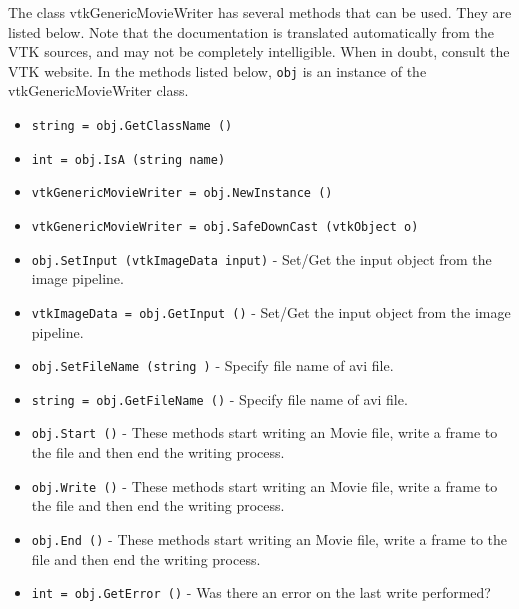The class vtkGenericMovieWriter has several methods that can be used.
  They are listed below.
Note that the documentation is translated automatically from the VTK sources,
and may not be completely intelligible.  When in doubt, consult the VTK website.
In the methods listed below, \verb|obj| is an instance of the vtkGenericMovieWriter class.
\begin{itemize}
\item  \verb|string = obj.GetClassName ()|

\item  \verb|int = obj.IsA (string name)|

\item  \verb|vtkGenericMovieWriter = obj.NewInstance ()|

\item  \verb|vtkGenericMovieWriter = obj.SafeDownCast (vtkObject o)|

\item  \verb|obj.SetInput (vtkImageData input)| -  Set/Get the input object from the image pipeline.

\item  \verb|vtkImageData = obj.GetInput ()| -  Set/Get the input object from the image pipeline.

\item  \verb|obj.SetFileName (string )| -  Specify file name of avi file.

\item  \verb|string = obj.GetFileName ()| -  Specify file name of avi file.

\item  \verb|obj.Start ()| -  These methods start writing an Movie file, write a frame to the file
 and then end the writing process.

\item  \verb|obj.Write ()| -  These methods start writing an Movie file, write a frame to the file
 and then end the writing process.

\item  \verb|obj.End ()| -  These methods start writing an Movie file, write a frame to the file
 and then end the writing process.

\item  \verb|int = obj.GetError ()| -  Was there an error on the last write performed?

\end{itemize}
